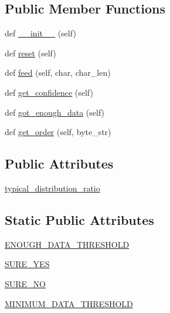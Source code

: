 \subsection*{Public Member Functions}
\begin{DoxyCompactItemize}
\item 
def \hyperlink{classpip_1_1__vendor_1_1chardet_1_1chardistribution_1_1CharDistributionAnalysis_af6b5a1ec32c8d302689dd98c9f170372}{\+\_\+\+\_\+init\+\_\+\+\_\+} (self)
\item 
def \hyperlink{classpip_1_1__vendor_1_1chardet_1_1chardistribution_1_1CharDistributionAnalysis_a45dda14cf45d7916201368c93ea16331}{reset} (self)
\item 
def \hyperlink{classpip_1_1__vendor_1_1chardet_1_1chardistribution_1_1CharDistributionAnalysis_aaf5c6e7561963bc088ce9d1a1c88cb34}{feed} (self, char, char\+\_\+len)
\item 
def \hyperlink{classpip_1_1__vendor_1_1chardet_1_1chardistribution_1_1CharDistributionAnalysis_a3ec0506365d5d77b42cbcee0532a4f72}{get\+\_\+confidence} (self)
\item 
def \hyperlink{classpip_1_1__vendor_1_1chardet_1_1chardistribution_1_1CharDistributionAnalysis_af67f16a55e5dd56ee361468b124c119d}{got\+\_\+enough\+\_\+data} (self)
\item 
def \hyperlink{classpip_1_1__vendor_1_1chardet_1_1chardistribution_1_1CharDistributionAnalysis_a77308260fe6b512569194586eca8b670}{get\+\_\+order} (self, byte\+\_\+str)
\end{DoxyCompactItemize}
\subsection*{Public Attributes}
\begin{DoxyCompactItemize}
\item 
\hyperlink{classpip_1_1__vendor_1_1chardet_1_1chardistribution_1_1CharDistributionAnalysis_a3a951ce11a89a4b15df60075d5fb30d0}{typical\+\_\+distribution\+\_\+ratio}
\end{DoxyCompactItemize}
\subsection*{Static Public Attributes}
\begin{DoxyCompactItemize}
\item 
\hyperlink{classpip_1_1__vendor_1_1chardet_1_1chardistribution_1_1CharDistributionAnalysis_a7622f211d9809038cfa7f00afd54c4b1}{E\+N\+O\+U\+G\+H\+\_\+\+D\+A\+T\+A\+\_\+\+T\+H\+R\+E\+S\+H\+O\+LD}
\item 
\hyperlink{classpip_1_1__vendor_1_1chardet_1_1chardistribution_1_1CharDistributionAnalysis_a8f94563a18013358cebe44c32976bb7b}{S\+U\+R\+E\+\_\+\+Y\+ES}
\item 
\hyperlink{classpip_1_1__vendor_1_1chardet_1_1chardistribution_1_1CharDistributionAnalysis_a428f4df01420900093e0679ae2f859ca}{S\+U\+R\+E\+\_\+\+NO}
\item 
\hyperlink{classpip_1_1__vendor_1_1chardet_1_1chardistribution_1_1CharDistributionAnalysis_ad33b58406c970211e2298c9a6e16e60e}{M\+I\+N\+I\+M\+U\+M\+\_\+\+D\+A\+T\+A\+\_\+\+T\+H\+R\+E\+S\+H\+O\+LD}
\end{DoxyCompactItemize}


